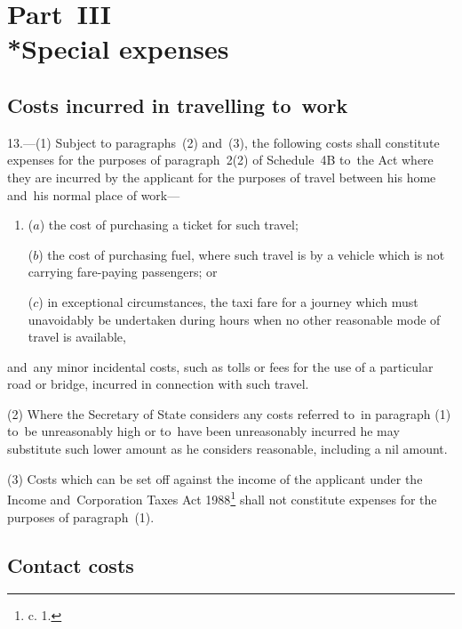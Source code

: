 \documentclass[12pt,a4paper]{article}
\begin{document}
\section[Part~III --- Special expenses]{Part~III\\*Special expenses}

\renewcommand\parthead{--- Part~III}

\subsection[13. Costs incurred in travelling to~work]{Costs incurred in travelling to~work}

13.—(1) Subject to
paragraphs~(2) and~(3), the following costs shall constitute expenses for the
purposes of paragraph~2(2) of Schedule~4B to~the Act where they are incurred by
the applicant for the purposes of travel between his home and~his normal place
of work—
\begin{enumerate}\item[]
($a$) the cost of purchasing a ticket for such travel;

($b$) the cost of purchasing fuel, where such travel is by a vehicle which is not
carrying fare-paying passengers; or

($c$) in exceptional circumstances, the taxi fare for a journey which must
unavoidably be undertaken during hours when no other reasonable mode of travel
is available,
\end{enumerate}
and~any minor incidental costs, such as tolls or fees for the use of a
particular road or bridge, incurred in connection with such travel.

(2) Where the Secretary of State considers any costs referred to~in paragraph
(1) to~be unreasonably high or to~have been unreasonably incurred he may
substitute such lower amount as he considers reasonable, including a nil amount.

(3) Costs which can be set off against the income of the applicant under the
Income and~Corporation Taxes Act 1988\footnote{ c. 1.} shall not constitute expenses for the
purposes of paragraph~(1).

\subsection[14. Contact costs]{Contact costs}
\end{document}

